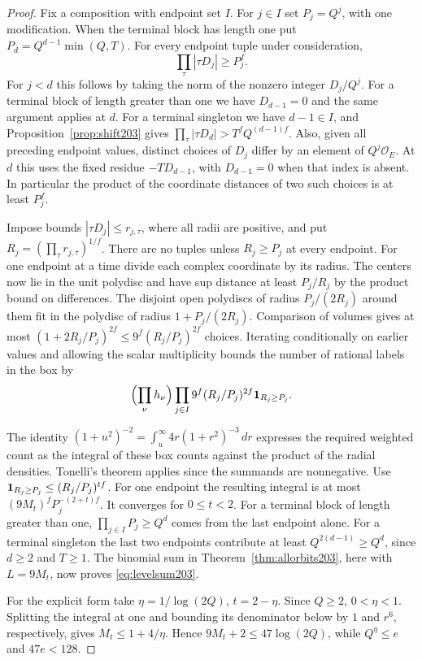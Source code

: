 \documentclass[a4paper,11pt]{article}
\theoremstyle{definition}
\theoremstyle{remark}
\numberwithin{equation}{section}
\begin{document}
\begin{proof}
Fix a composition with endpoint set \(I\). For \(j\in I\) set
\(P_j=Q^j\), with one modification. When the terminal block has
length one put \(P_d=Q^{d-1}\min(Q,T)\). For every endpoint tuple
under consideration,
\[
      \prod_\tau|\tau D_j|\ge P_j^f .
\]
For \(j<d\) this follows by taking the norm of the nonzero
integer \(D_j/Q^j\). For a terminal block of length greater
than one we have \(D_{d-1}=0\) and the same argument applies at
\(d\). For a terminal singleton we have \(d-1\in I\), and
Proposition~\ref{prop:shift203} gives
\(\prod_\tau|\tau D_d|>T^fQ^{(d-1)f}\). Also, given all preceding
endpoint values, distinct choices of \(D_j\) differ by an element
of \(Q^j\mathcal O_E\). At \(d\) this uses the fixed residue
\(-T D_{d-1}\), with \(D_{d-1}=0\) when that index is absent.
In particular the product of the coordinate distances of two such
choices is at least \(P_j^f\).

Impose bounds \(|\tau D_j|\le r_{j,\tau}\), where all radii are
positive, and put \(R_j=(\prod_\tau r_{j,\tau})^{1/f}\).
There are no tuples unless \(R_j\ge P_j\) at every endpoint.
For one endpoint at a time divide each complex coordinate by its
radius. The centers now lie in the unit polydisc and have sup
distance at least \(P_j/R_j\) by the product bound on differences.
The disjoint open polydiscs of radius \(P_j/(2R_j)\) around them
fit in the polydisc of radius \(1+P_j/(2R_j)\). Comparison of
volumes gives at most
\((1+2R_j/P_j)^{2f}\le 9^f(R_j/P_j)^{2f}\) choices.
Iterating conditionally on earlier values and allowing the scalar
multiplicity bounds the number of rational labels in the box by
\[
 \Bigl(\prod_\nu h_\nu\Bigr)
 \prod_{j\in I}9^f (R_j/P_j)^{2f}{\bf1}_{R_j\ge P_j}.
\]

The identity
\((1+u^2)^{-2}=\int_u^\infty4r(1+r^2)^{-3}\,dr\)
expresses the required weighted count as the integral of these
box counts against the product of the radial densities.
Tonelli's theorem applies since the summands are nonnegative.
Use \({\bf1}_{R_j\ge P_j}\le(R_j/P_j)^{tf}\). For one endpoint
the resulting integral is at most
\((9M_t)^f P_j^{-(2+t)f}\). It converges for \(0\le t<2\).
For a terminal block of length greater than one,
\(\prod_{j\in I}P_j\ge Q^d\) comes from the last endpoint alone.
For a terminal singleton the last two endpoints contribute at least
\(Q^{2(d-1)}\ge Q^d\), since \(d\ge2\) and \(T\ge1\).
The binomial sum in Theorem~\ref{thm:allorbits203}, here with
\(L=9M_t\), now proves \eqref{eq:levelsum203}.

For the explicit form take \(\eta=1/\log(2Q)\), \(t=2-\eta\).
Since \(Q\ge2\), \(0<\eta<1\). Splitting the integral at one
and bounding its denominator below by \(1\) and \(r^6\),
respectively, gives \(M_t\le1+4/\eta\). Hence
\(9M_t+2\le47\log(2Q)\), while \(Q^\eta\le e\) and \(47e<128\).
\end{proof}
\end{document}
